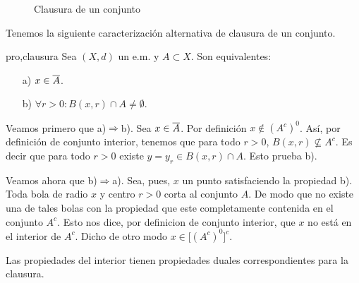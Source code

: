 \begin{figure}
\begin{center}
	\caption{Clausura de un conjunto}\label{fig,clausura}
\end{center}
\end{figure}

Tenemos la siguiente caracterización alternativa de clausura de
un conjunto.
\begin{proposicion}{pro,clausura} Sea $(X,d)$ un e.m. y $A\subset X$. Son
equivalentes:
\begin{itemize}
\item[a)] $x\in \overline{A}$.
\item[b)] $\forall r>0: B(x,r)\cap A\neq\emptyset$.
\end{itemize}
\end{proposicion}
\begin{demo}Veamos primero que a)$\Rightarrow$b). Sea $x\in \overline{A}$. Por
definición $x\notin (A^c)^0$. Así, por definición de
conjunto interior, tenemos que para todo $r>0$, $B(x,r)\nsubseteq
A^c$. Es decir que para todo $r>0$ existe $y=y_r\in B(x,r)\cap A$.
Esto prueba b).

Veamos ahora que b)$\Rightarrow$a). Sea, pues, $x$ un punto
satisfaciendo la propiedad b). Toda bola de radio $x$ y centro
$r>0$ corta al conjunto $A$. De modo que no existe una de tales
bolas con la propiedad que este completamente contenida en el
conjunto $A^c$. Esto nos dice, por definicion de conjunto
interior, que $x$ no está en el interior de $A^c$. Dicho de otro
modo $x\in \bigl[(A^c)^0\bigr]^c$.
\end{demo}

Las propiedades del interior tienen propiedades duales
correspondientes para la clausura.

